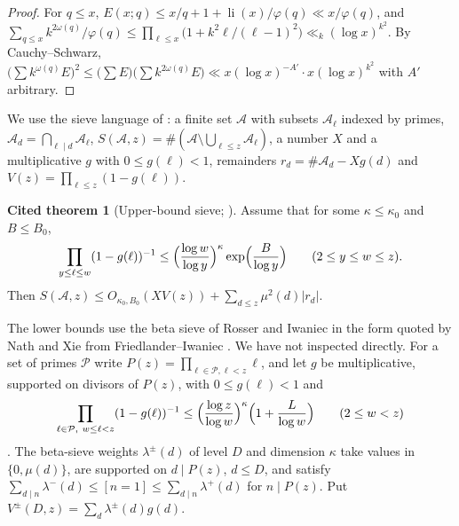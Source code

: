 \documentclass[11pt,reqno]{amsart}
\theoremstyle{definition}
\newtheorem{citedthm}[theorem]{Cited theorem}
\newcommand{\cA}{\mathcal A}
\newcommand{\li}{\operatorname{li}}
\begin{document}
\begin{proof}
For $q\le x$, $E(x;q)\le x/q+1+\li(x)/\varphi(q)\ll x/\varphi(q)$, and
$\sum_{q\le x}k^{2\omega(q)}/\varphi(q)\le\prod_{\ell\le x}\bigl(1+k^2\ell/(\ell-1)^2\bigr)\ll_k(\log x)^{k^2}$.
By Cauchy--Schwarz,
$\bigl(\sum k^{\omega(q)}E\bigr)^2\le\bigl(\sum E\bigr)\bigl(\sum k^{2\omega(q)}E\bigr)\ll x(\log x)^{-A'}\cdot x(\log x)^{k^2}$
with $A'$ arbitrary.
\end{proof}

We use the sieve language of \cite[\S1]{Ford}: a finite set $\cA$ with
subsets $\cA_\ell$ indexed by primes, $\cA_d=\bigcap_{\ell\mid d}\cA_\ell$,
$S(\cA,z)=\#(\cA\setminus\bigcup_{\ell\le z}\cA_\ell)$, a number $X$ and a
multiplicative $g$ with $0\le g(\ell)<1$, remainders
$r_d=\#\cA_d-Xg(d)$ and $V(z)=\prod_{\ell\le z}(1-g(\ell))$.

\begin{citedthm}[Upper-bound sieve; {\cite[Thm.~2.4]{Ford}}]\label{cit:upper}
Assume that for some $\kappa\le\kappa_0$ and $B\le B_0$,
\begin{equation}\label{eq:Omega}
\prod_{y\le\ell\le w}(1-g(\ell))^{-1}\le\Bigl(\frac{\log w}{\log y}\Bigr)^{\kappa}\exp\Bigl(\frac B{\log y}\Bigr)\qquad(2\le y\le w\le z).
\end{equation}
Then $S(\cA,z)\le O_{\kappa_0,B_0}(XV(z))+\sum_{d\le z}\mu^2(d)|r_d|$.
\end{citedthm}

The lower bounds use the beta sieve of Rosser and Iwaniec in the form
quoted by Nath and Xie \cite[\S3.2--3.3]{NX} from Friedlander--Iwaniec
\cite[Thm.~11.12]{OdC}.  We have not inspected \cite{OdC} directly.  For
a set of primes $\mathcal P$ write $P(z)=\prod_{\ell\in\mathcal P,\ell<z}\ell$,
and let $g$ be multiplicative, supported on divisors of $P(z)$, with
$0\le g(\ell)<1$ and
\begin{equation}\label{eq:NX34}
\prod_{\ell\in\mathcal P,\ w\le\ell<z}(1-g(\ell))^{-1}\le\Bigl(\frac{\log z}{\log w}\Bigr)^{\kappa}\Bigl(1+\frac L{\log w}\Bigr)\qquad(2\le w<z)
\end{equation}
\cite[(3.4)]{NX}.  The beta-sieve weights $\lambda^\pm(d)$ of level $D$
and dimension $\kappa$ take values in $\{0,\mu(d)\}$, are supported on
$d\mid P(z)$, $d\le D$, and satisfy
$\sum_{d\mid n}\lambda^-(d)\le[n=1]\le\sum_{d\mid n}\lambda^+(d)$ for
$n\mid P(z)$.  Put $V^\pm(D,z)=\sum_d\lambda^\pm(d)g(d)$.
\end{document}
